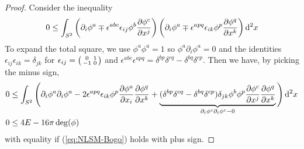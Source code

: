 \documentclass[a4paper,11pt]{article}
\begin{document}
    \begin{proof}
        Consider the inequality 
        \begin{equation}
            \begin{split}
                0 \leq \int_{S^2} \left( \partial_i \phi^a \mp \epsilon^{abc} \epsilon_{ij} \phi^b \pdv{\phi^c}{x^j} \right) \left( \partial_i \phi^a \mp \epsilon^{apq} \epsilon_{ik} \phi^p \pdv{\phi^q}{x^k} \right) \dd[2]{x}
            \end{split}
        \end{equation}
        To expand the total square, we use $\phi^a \phi^a = 1$ so $\phi^a \partial_i \phi^a = 0$ and the identities $\epsilon_{ij} \epsilon_{ik} = \delta_{jk}$ for $\epsilon_{ij} = \smqty(0 & 1\\-1 & 0)$ and $\epsilon^{abc} \epsilon^{apq} = \delta^{bp} \delta^{cq} - \delta^{bq} \delta^{cp}$. Then we have, by picking the minus sign,
        \begin{equation}
            \begin{split}
                0 &\leq \int_{S^2} \Bigg( \partial_i \phi^a \partial_i \phi^a - 2 \epsilon^{apq} \epsilon_{ik} \phi^p \pdv{\phi^a}{x_i} \pdv{\phi^q}{x^k} + \underbrace{(\delta^{bp} \delta^{cq} - \delta^{bq} \delta^{cp}) \delta_{jk} \phi^b \phi^p \pdv{\phi^c}{x^j} \pdv{\phi^q}{x^k}}_{\partial_i \phi^c \partial_i \phi^c - 0}  \Bigg) \dd[2]{x}\\
                0 & \leq 4 E - 16 \pi \deg(\phi)
            \end{split}
        \end{equation}
        with equality if (\ref{eq:NLSM-Bogo}) holds with plus sign.
    \end{proof}
\end{document}
